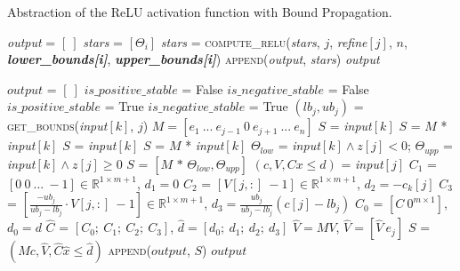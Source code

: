 \begin{algorithm}[t!]
  \caption{Abstraction of the ReLU activation function with Bound Propagation.}
  \label{alg:new-relu-abst}
  \small
  \begin{algorithmic}[1]
      \State \emph{output} = $[\:]$
        \State \emph{stars} = $[\Theta_i]$
          \State \emph{stars} = \textsc{compute\_relu}(\emph{stars}, $j$, \emph{refine}$[j]$, $n$, \textbf{\emph{lower\_bounds[i]}}, \textbf{\emph{upper\_bounds[i]}})
        \EndFor
        \State \textsc{append}(\emph{output}, \emph{stars})
      \EndFor
      \State \Return \emph{output}
    \EndFunction

      \State $output$ = $[\:]$
        \State $is\_positive\_stable$ = False
        \State $is\_negative\_stable$ = False
          \State $is\_positive\_stable$ = True
          \State $is\_negative\_stable$ = True
        \Else
          \State $(lb_j, ub_j)$ = \textsc{get\_bounds}(\emph{input}$[k]$, $j$)
        \EndIf
        \State $M = [e_1\ ...\ e_{j-1}\ 0\ e_{j+1}\ ...\ e_n]$
          \State $S$ = \emph{input}$[k]$
          \State $S$ = $M$ * \emph{input}$[k]$
          \State $S$ = \emph{input}$[k]$
          \State $S$ = $M$ * \emph{input}$[k]$
        \Else
            \State $\Theta_{low}$ = \emph{input}$[k] \wedge z[j] < 0$;
            $\Theta_{upp}$ = \emph{input}$[k] \wedge z[j] \geq 0$
            \State $S$ = $[M \mbox{ * } \Theta_{low}, \Theta_{upp}]$
          \Else
            \State $(c,V,Cx \leq d)$ = \emph{input}$[j]$
            \State $C_1$ = $[0\ 0\ ...\ -1] \in \mathbb{R}^{1 \times m+1}$, $d_1 = 0$
            \State $C_2$ = $[V[j,:]\ -1] \in \mathbb{R}^{1 \times m+1}$, $d_2 = -c_k[j]$
            \State $C_3$ = $[\frac{-ub_j}{ub_j - lb_j} \cdot V[j,:]\ -1] \in \mathbb{R}^{1 \times m+1}$, $d_3 = \frac{ub_j}{ub_j - lb_j} (c[j] - lb_j)$
            \State $C_0$ = $[C\ 0^{m \times 1}]$, $d_0 = d$
            \State $\hat{C}$ = $[C_0;\ C_1;\ C_2;\ C_3]$, $\hat{d} = [d_0;\ d_1;\ d_2;\ d_3]$
            \State $\hat{V} = MV$, $\hat{V} = [\hat{V}\ e_j]$
            \State $S$ = $(Mc, \hat{V}, \hat{C} \hat{x} \leq \hat{d})$
          \EndIf
        \EndIf
        \State \textsc{append}($output$, $S$)
      \EndFor
      \State \Return $output$
    \EndFunction
  \end{algorithmic}
\end{algorithm}


